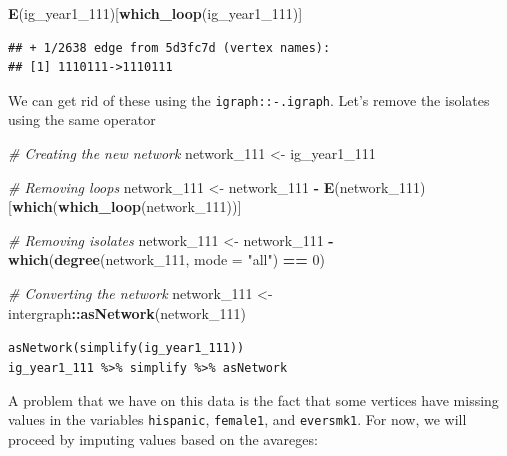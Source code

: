 \documentclass[]{book}
\newenvironment{Shaded}{\begin{snugshade}}{\end{snugshade}}
\newcommand{\CommentTok}[1]{\textcolor[rgb]{0.56,0.35,0.01}{\textit{#1}}}
\newcommand{\DataTypeTok}[1]{\textcolor[rgb]{0.13,0.29,0.53}{#1}}
\newcommand{\DecValTok}[1]{\textcolor[rgb]{0.00,0.00,0.81}{#1}}
\newcommand{\KeywordTok}[1]{\textcolor[rgb]{0.13,0.29,0.53}{\textbf{#1}}}
\newcommand{\NormalTok}[1]{#1}
\newcommand{\OperatorTok}[1]{\textcolor[rgb]{0.81,0.36,0.00}{\textbf{#1}}}
\newcommand{\StringTok}[1]{\textcolor[rgb]{0.31,0.60,0.02}{#1}}
\begin{document}
\begin{Shaded}
\begin{Highlighting}[]
\KeywordTok{E}\NormalTok{(ig_year1_}\DecValTok{111}\NormalTok{)[}\KeywordTok{which_loop}\NormalTok{(ig_year1_}\DecValTok{111}\NormalTok{)]}
\end{Highlighting}
\end{Shaded}

\begin{verbatim}
## + 1/2638 edge from 5d3fc7d (vertex names):
## [1] 1110111->1110111
\end{verbatim}

We can get rid of these using the \texttt{igraph::-.igraph}. Let's remove the isolates using the same operator

\begin{Shaded}
\begin{Highlighting}[]
\CommentTok{# Creating the new network}
\NormalTok{network_}\DecValTok{111}\NormalTok{ <-}\StringTok{ }\NormalTok{ig_year1_}\DecValTok{111}

\CommentTok{# Removing loops}
\NormalTok{network_}\DecValTok{111}\NormalTok{ <-}\StringTok{ }\NormalTok{network_}\DecValTok{111} \OperatorTok{-}\StringTok{ }\KeywordTok{E}\NormalTok{(network_}\DecValTok{111}\NormalTok{)[}\KeywordTok{which}\NormalTok{(}\KeywordTok{which_loop}\NormalTok{(network_}\DecValTok{111}\NormalTok{))]}

\CommentTok{# Removing isolates}
\NormalTok{network_}\DecValTok{111}\NormalTok{ <-}\StringTok{ }\NormalTok{network_}\DecValTok{111} \OperatorTok{-}\StringTok{ }\KeywordTok{which}\NormalTok{(}\KeywordTok{degree}\NormalTok{(network_}\DecValTok{111}\NormalTok{, }\DataTypeTok{mode =} \StringTok{"all"}\NormalTok{) }\OperatorTok{==}\StringTok{ }\DecValTok{0}\NormalTok{)}

\CommentTok{# Converting the network}
\NormalTok{network_}\DecValTok{111}\NormalTok{ <-}\StringTok{ }\NormalTok{intergraph}\OperatorTok{::}\KeywordTok{asNetwork}\NormalTok{(network_}\DecValTok{111}\NormalTok{)}
\end{Highlighting}
\end{Shaded}

\texttt{asNetwork(simplify(ig\_year1\_111))}
\texttt{ig\_year1\_111\ \%\textgreater{}\%\ simplify\ \%\textgreater{}\%\ asNetwork}

A problem that we have on this data is the fact that some vertices have
missing values in the variables \texttt{hispanic}, \texttt{female1}, and \texttt{eversmk1}. For now,
we will proceed by imputing values based on the avareges:
\end{document}
